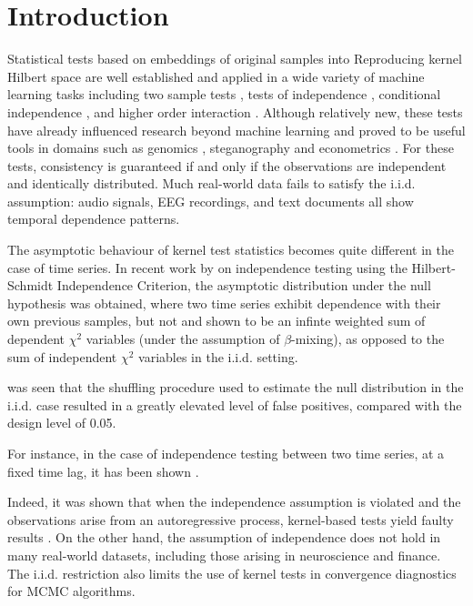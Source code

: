 \documentclass{article} %
\begin{document}
\section{Introduction}
Statistical tests based on embeddings of original samples into Reproducing kernel Hilbert space are well established and applied in a wide variety of machine learning tasks including two sample tests \cite{HarBacMou08,gretton2012kernel,SugSuzItoKanetal11}, tests of independence \cite{gretton_kernel_2008,ZhaPetJanSch11}, conditional independence  \cite{fukumizu2007kernel,ZhaPetJanSch11}, and higher order interaction \cite{sejdinovic2013kernel}. %
Although relatively new, these tests have already influenced research beyond machine learning and proved to be useful tools in domains such as genomics \cite{Schweikert2013}, steganography \cite{Solanki2008} and econometrics \cite{zaremba2014measures}.       
For these tests,  consistency is guaranteed if and only if the observations are independent and identically distributed. 
Much real-world data fails to satisfy the i.i.d. assumption: audio signals, EEG recordings, and text documents all show  temporal dependence patterns.  

The asymptotic behaviour of kernel test statistics becomes quite different in the case of time series. 
In recent work by \cite{chwialkowski2014kernel} on independence testing using the Hilbert-Schmidt Independence
Criterion, the asymptotic distribution under the null hypothesis was obtained, 
where two time series exhibit dependence with their own previous samples, but not 
and shown to be 
an infinte weighted sum of dependent $\chi^2$ variables (under the assumption of $\beta$-mixing), 
as opposed to the sum of independent $\chi^2$ variables in the i.i.d. setting.

was seen that the shuffling procedure used to estimate the null distribution in the i.i.d.
case resulted in a greatly elevated level of false positives, compared with the design level of 0.05. 


For instance, in the case
of independence testing between two time series, at a fixed time lag, it has been shown \cite{chwialkowski2014kernel}.

Indeed, it was shown that when the independence assumption is violated and the observations arise from an autoregressive process, kernel-based tests yield faulty results \cite{chwialkowski2014kernel}. On the other hand, the assumption of independence does not hold in many real-world datasets, including those arising in neuroscience and finance. The i.i.d. restriction also limits the use of kernel tests in convergence diagnostics for MCMC algorithms. 
\end{document}
